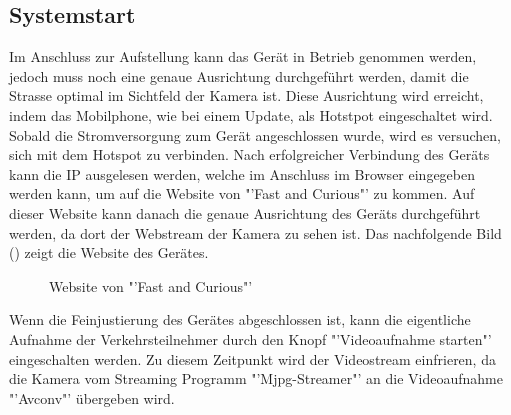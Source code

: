 \subsection{Systemstart}
Im Anschluss zur Aufstellung kann das Gerät in Betrieb genommen werden, jedoch muss noch eine genaue Ausrichtung durchgeführt werden, damit die Strasse optimal im Sichtfeld der Kamera ist. Diese Ausrichtung wird erreicht, indem das Mobilphone, wie bei einem Update, als Hotstpot eingeschaltet wird. Sobald die Stromversorgung zum Gerät angeschlossen wurde, wird es versuchen, sich mit dem Hotspot zu verbinden. Nach erfolgreicher Verbindung des Geräts kann die IP ausgelesen werden, welche im Anschluss im Browser eingegeben werden kann, um auf die Website von "'Fast and Curious"' zu kommen. Auf dieser Website kann danach die genaue Ausrichtung des Geräts durchgeführt werden, da dort der Webstream der Kamera zu sehen ist. Das nachfolgende Bild () zeigt die Website des Gerätes.

\begin{figure}[H]
  \centering
  \caption{Website von "'Fast and Curious"'}
  \label{bWebsite}
\end{figure} 

Wenn die Feinjustierung des Gerätes abgeschlossen ist, kann die eigentliche Aufnahme der Verkehrsteilnehmer durch den Knopf "'Videoaufnahme starten"' eingeschalten werden. Zu diesem Zeitpunkt wird der Videostream einfrieren, da die Kamera vom Streaming Programm "'Mjpg-Streamer"' an die Videoaufnahme "'Avconv"' übergeben wird.